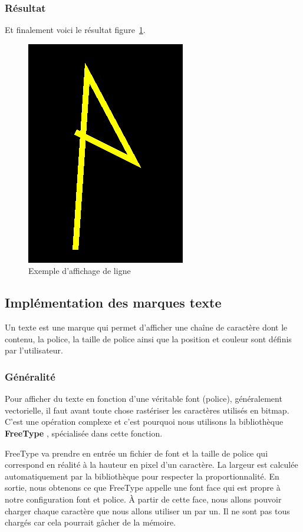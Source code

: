 \documentclass[12pt]{article}
\begin{document}
\subsubsection{Résultat}
Et finalement voici le résultat figure~\ref{fig:line}.
\begin{figure}[htp]
  \centering
  \includegraphics[scale=0.8]{images/line_example}
  \caption{Exemple d'affichage de ligne}
  \label{fig:line}
\end{figure}


\subsection{Implémentation des marques texte}
Un texte est une marque qui permet d'afficher une chaîne de caractère dont le contenu, la police, la taille de police ainsi que la position et couleur sont définis par l'utilisateur.

\subsubsection{Généralité}

Pour afficher du texte en fonction d'une véritable font (police), généralement vectorielle, il faut avant toute chose rastériser les caractères utilisés en bitmap.
C'est une opération complexe et c'est pourquoi nous utilisons la bibliothèque \textbf{FreeType} \cite{freetype-rs}, spécialisée dans cette fonction.

FreeType va prendre en entrée un fichier de font et la taille de police qui correspond en réalité à la hauteur en pixel d'un caractère. La largeur est calculée automatiquement
par la bibliothèque pour respecter la proportionnalité. En sortie, nous obtenons ce que FreeType appelle une \og font face\fg{} qui est propre à notre configuration font et police.
À partir de cette face, nous allons pouvoir charger chaque caractère que nous allons utiliser un par un. Il ne sont pas tous chargés car cela pourrait gâcher de la mémoire.
\end{document}
